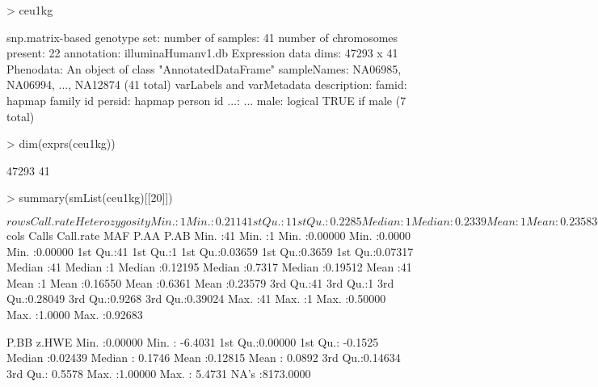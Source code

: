\clearpage

\begin{Schunk}
\begin{Sinput}
> ceu1kg
\end{Sinput}
\begin{Soutput}
snp.matrix-based genotype set:
number of samples:  41 
number of chromosomes present:  22 
annotation: illuminaHumanv1.db 
Expression data dims: 47293 x 41 
Phenodata: An object of class "AnnotatedDataFrame"
  sampleNames: NA06985, NA06994, ..., NA12874  (41 total)
  varLabels and varMetadata description:
    famid: hapmap family id
    persid: hapmap person id
    ...: ...
    male: logical TRUE if male
    (7 total)
\end{Soutput}
\begin{Sinput}
> dim(exprs(ceu1kg))
\end{Sinput}
\begin{Soutput}
[1] 47293    41
\end{Soutput}
\end{Schunk}

\clearpage

\begin{Schunk}
\begin{Sinput}
> summary(smList(ceu1kg)[[20]])
\end{Sinput}
{\Large
\begin{Soutput}
$rows
   Call.rate Heterozygosity  
 Min.   :1   Min.   :0.2114  
 1st Qu.:1   1st Qu.:0.2285  
 Median :1   Median :0.2339  
 Mean   :1   Mean   :0.2358  
 3rd Qu.:1   3rd Qu.:0.2430  
 Max.   :1   Max.   :0.2555  

$cols
     Calls      Call.rate      MAF               P.AA             P.AB        
 Min.   :41   Min.   :1   Min.   :0.00000   Min.   :0.0000   Min.   :0.00000  
 1st Qu.:41   1st Qu.:1   1st Qu.:0.03659   1st Qu.:0.3659   1st Qu.:0.07317  
 Median :41   Median :1   Median :0.12195   Median :0.7317   Median :0.19512  
 Mean   :41   Mean   :1   Mean   :0.16550   Mean   :0.6361   Mean   :0.23579  
 3rd Qu.:41   3rd Qu.:1   3rd Qu.:0.28049   3rd Qu.:0.9268   3rd Qu.:0.39024  
 Max.   :41   Max.   :1   Max.   :0.50000   Max.   :1.0000   Max.   :0.92683  
                                                                              
      P.BB             z.HWE          
 Min.   :0.00000   Min.   :  -6.4031  
 1st Qu.:0.00000   1st Qu.:  -0.1525  
 Median :0.02439   Median :   0.1746  
 Mean   :0.12815   Mean   :   0.0892  
 3rd Qu.:0.14634   3rd Qu.:   0.5578  
 Max.   :1.00000   Max.   :   5.4731  
                   NA's   :8173.0000  
\end{Soutput}
}
\end{Schunk}

